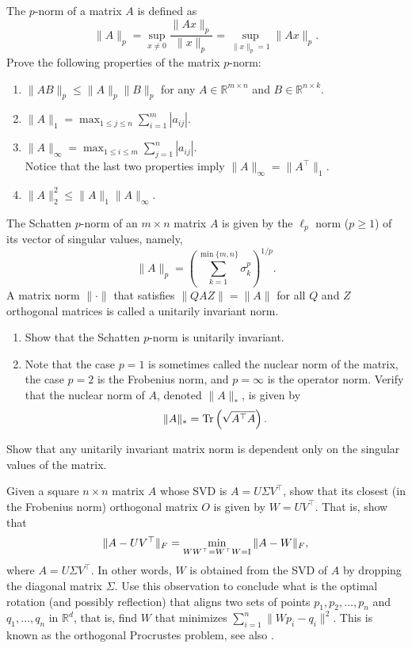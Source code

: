 \begin{myexercise}
The $p$-norm of a matrix $A$ is defined as
$$\|A\|_p = \sup_{x\neq 0} \frac{\|Ax\|_p}{\|x\|_p} = \sup_{\|x\|_p=1} \|Ax\|_p.$$
Prove the following properties of the matrix $p$-norm:
\begin{enumerate}
\item $\|AB\|_p \leq \|A\|_p \|B\|_p$ for any $A \in \mathbb{R}^{m\times n}$ and $B\in \mathbb{R}^{n\times k}$.
\item $\|A\|_1 = \max_{1\leq j \leq n} \sum_{i=1}^m |a_{ij}|$.
\item $\|A\|_\infty =  \max_{1 \leq i \leq m} \sum_{j=1}^n |a_{ij}|$. \\
Notice that the last two properties imply $\|A\|_\infty = \|A^\top  \|_1$.
\item $\|A\|_2^2 \leq \|A\|_1 \|A\|_\infty$.
\end{enumerate}
\end{myexercise}


\begin{myexercise}
The Schatten $p$-norm of an $m\times n$ matrix $A$ is given by the $\ell_p$ norm ($p\geq 1$) of its vector of singular values, namely,
$$\|A\|_p = \left(\sum_{k=1}^{\min\{m,n \}} \sigma_k^p\right)^{1/p}.$$
A matrix norm $\| \cdot \|$ that satisfies $\|QAZ\| = \|A\|$ for all $Q$ and $Z$ orthogonal matrices is called a unitarily invariant norm.
\begin{enumerate}
\item Show that the Schatten $p$-norm is unitarily invariant.
\item Note that the case $p=1$ is sometimes called the nuclear norm of the matrix, the case $p=2$ is the Frobenius norm, and $p=\infty$ is the operator norm. Verify that the nuclear norm of $A$, denoted $\|A\|_*$, is given by
$$\|A\|_{*} = \operatorname{Tr}\left(\sqrt{A^\top   A} \right).$$
\end{enumerate}   
\end{myexercise}

\begin{myexercise}
Show that any unitarily invariant matrix norm is dependent only on the singular values of the matrix.   
\end{myexercise}


\begin{myexercise}
Given a square $n\times n$ matrix $A$ whose SVD is $A=U\Sigma V^\top  $, show that its closest (in the Frobenius norm) orthogonal matrix $O$ is given by $W=UV^\top  $. That is, show that
    $$\|A - UV^\top  \|_F = \min_{WW^\top  =W^\top  W=\operatorname{I}} \|A-W\|_F,$$ where
    $A=U\Sigma V^\top  $.
    In other words, $W$ is obtained from the SVD of $A$ by dropping the diagonal matrix $\Sigma$. Use this observation to conclude what is the optimal rotation (and possibly reflection) that aligns two sets of points $p_1,p_2,\ldots,p_n$ and $q_1,\ldots,q_n$ in $\mathbb{R}^d$, that is, find $W$ that minimizes $\sum_{i=1}^n \|Wp_i-q_i\|^2$. This is known as the orthogonal Procrustes problem, see also  \cite{arun1987least,fan1955some,keller1975closest}.    
\end{myexercise}


